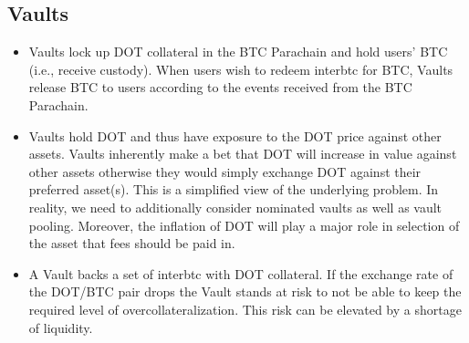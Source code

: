 \documentclass[a4paper,10pt,english]{sphinxmanual}
\begin{document}
\subsection{Vaults}
\label{\detokenize{economics/incentives:vaults}}\begin{itemize}
\item {} 
 Vaults lock up DOT collateral in the BTC Parachain and hold users’ BTC (i.e., receive custody). When users wish to redeem interbtc for BTC, Vaults release BTC to users according to the events received from the BTC Parachain.

\item {} 
 Vaults hold DOT and thus have exposure to the DOT price against other assets. Vaults inherently make a bet that DOT will increase in value against other assets \textendash{} otherwise they would simply exchange DOT against their preferred asset(s). This is a simplified view of the underlying problem. In reality, we need to additionally consider nominated vaults as well as vault pooling. Moreover, the inflation of DOT will play a major role in selection of the asset that fees should be paid in.

\item {} 
 A Vault backs a set of interbtc with DOT collateral. If the exchange rate of the DOT/BTC pair drops the Vault stands at risk to not be able to keep the required level of over\sphinxhyphen{}collateralization. This risk can be elevated by a shortage of liquidity.

\end{itemize}
\end{document}
